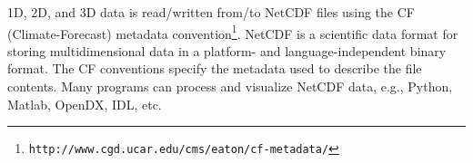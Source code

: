 1D, 2D, and 3D data is read/written from/to NetCDF files using the CF (Climate-Forecast) 
metadata convention\footnote{\texttt{http://www.cgd.ucar.edu/cms/eaton/cf-metadata/}}. 
NetCDF is a scientific data format for storing multidimensional data in a platform- 
and language-independent binary format. The CF conventions specify the metadata 
used to describe the file contents.
Many programs can process and visualize NetCDF data, e.g., Python, Matlab, OpenDX, IDL, etc. 
